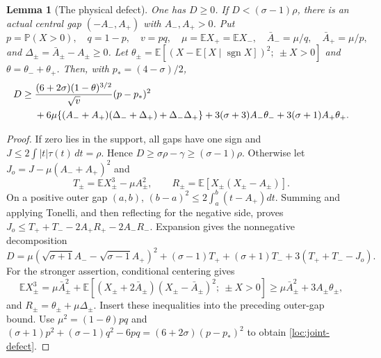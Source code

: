 \documentclass[aop,preprint]{imsart}
\newtheorem{lemma}[theorem]{Lemma}
\theoremstyle{definition}
\newcommand{\E}{\mathbb E}
\newcommand{\PP}{\mathbb P}
\numberwithin{equation}{section}
\begin{document}
\begin{lemma}[The physical defect]\label{loc:defect}
One has $D\ge0$. If $D<(\sigma-1)\rho$, there is an actual central
gap $(-A_-,A_+)$ with $A_-,A_+>0$. Put
\[
 p=\PP(X>0),\quad q=1-p,\quad v=pq,\quad
 \mu=\E X_+=\E X_-,\quad
 \bar A_-=\mu/q,\quad\bar A_+=\mu/p,
\]
and $\Delta_\pm=\bar A_\pm-A_\pm\ge0$.
Let $\theta_\pm=\E[(X-\E[X\mid\operatorname{sgn}X])^2;
\ \pm X>0]$ and $\theta=\theta_-+\theta_+$.
Then, with $p_*=(4-\sigma)/2$,
\begin{align}\label{loc:joint-defect}
 D\ge{}&\frac{(6+2\sigma)(1-\theta)^{3/2}}{\sqrt v}
                    (p-p_*)^2\notag\\
 &+6\mu\{(A_-+A_+)(\Delta_-+\Delta_+)+\Delta_-\Delta_+\}
 +3(\sigma+3)A_-\theta_-+3(\sigma+1)A_+\theta_+.
\end{align}
\end{lemma}
\begin{proof}
If zero lies in the support, all gaps have one sign and
$J\le2\int|t|\tau(t)\,dt=\rho$. Hence
$D\ge\sigma\rho-\gamma\ge(\sigma-1)\rho$.
Otherwise let $J_o=J-\mu(A_-+A_+)^2$ and
\[
 T_\pm=\E X_\pm^3-\mu A_\pm^2,
 \qquad R_\pm=\E[X_\pm(X_\pm-A_\pm)].
\]
On a positive outer gap $(a,b)$,
$(b-a)^2\le2\int_a^b(t-A_+)dt$.
Summing and applying Tonelli, and then reflecting for the negative
side, proves $J_o\le T_++T_--2A_+R_+-2A_-R_-$.
Expansion gives the nonnegative decomposition
\[
 D=\mu(\sqrt{\sigma+1}A_--\sqrt{\sigma-1}A_+)^2
 +(\sigma-1)T_++(\sigma+1)T_-+3(T_++T_--J_o).
\]
For the stronger assertion, conditional centering gives
\[
 \E X_\pm^3=\mu\bar A_\pm^2+
 \E[(X_\pm+2\bar A_\pm)(X_\pm-\bar A_\pm)^2;
                         \ \pm X>0]
 \ge\mu\bar A_\pm^2+3A_\pm\theta_\pm,
\]
and $R_\pm=\theta_\pm+\mu\Delta_\pm$.
Insert these inequalities into the preceding outer-gap bound.
Use $\mu^2=(1-\theta)pq$ and
$(\sigma+1)p^2+(\sigma-1)q^2-6pq
=(6+2\sigma)(p-p_*)^2$ to obtain \eqref{loc:joint-defect}.
\end{proof}
\end{document}
